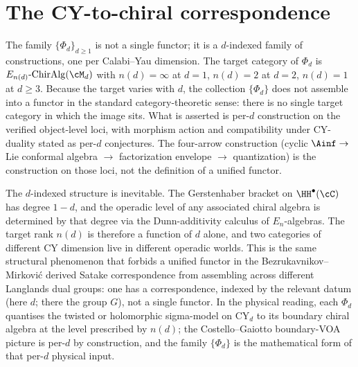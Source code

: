 \section{The CY-to-chiral correspondence}
\label{sec:cy-chiral-functor}
\label{sec:cy-d2-functor}

The family $\{\Phi_d\}_{d \geq 1}$ is not a single functor; it is a $d$-indexed family of constructions, one per Calabi--Yau dimension. The target category of $\Phi_d$ is $E_{n(d)}\text{-}\mathrm{ChirAlg}(\cM_d)$ with $n(d) = \infty$ at $d = 1$, $n(d) = 2$ at $d = 2$, $n(d) = 1$ at $d \geq 3$. Because the target varies with $d$, the collection $\{\Phi_d\}$ does not assemble into a functor in the standard category-theoretic sense: there is no single target category in which the image sits. What is asserted is per-$d$ construction on the verified object-level loci, with morphism action and compatibility under CY-duality stated as per-$d$ conjectures. The four-arrow construction (cyclic $\Ainf \to$ Lie conformal algebra $\to$ factorization envelope $\to$ quantization) is the construction on those loci, not the definition of a unified functor.

The $d$-indexed structure is inevitable. The Gerstenhaber bracket on $\HH^\bullet(\cC)$ has degree $1 - d$, and the operadic level of any associated chiral algebra is determined by that degree via the Dunn-additivity calculus of $E_n$-algebras. The target rank $n(d)$ is therefore a function of $d$ alone, and two categories of different CY dimension live in different operadic worlds. This is the same structural phenomenon that forbids a unified functor in the Bezrukavnikov--Mirkovi\'c derived Satake correspondence from assembling across different Langlands dual groups: one has a correspondence, indexed by the relevant datum (here $d$; there the group $G$), not a single functor. In the physical reading, each $\Phi_d$ quantises the twisted or holomorphic sigma-model on $\mathrm{CY}_d$ to its boundary chiral algebra at the level prescribed by $n(d)$; the Costello--Gaiotto boundary-VOA picture is per-$d$ by construction, and the family $\{\Phi_d\}$ is the mathematical form of that per-$d$ physical input.

